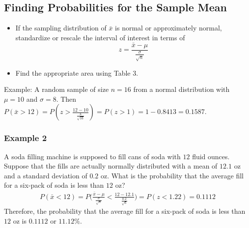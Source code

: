 \documentclass[12pt, letterpaper]{article}
\begin{document}
        \subsection{Finding Probabilities for the Sample Mean}
            \begin{itemize}
                \item If the sampling distribution of $\bar{x}$ is normal or approximately normal, standardize or rescale the interval of interest in terms of $$z = \frac{\bar{x} - \mu}{\frac{\sigma}{\sqrt{n}}}$$
                \item Find the appropriate area using Table 3.
            \end{itemize}
            Example: A random sample of size $n = 16$ from a normal distribution with $\mu = 10$ and $\sigma = 8$. Then $P(\bar{x} > 12) = P(z > \frac{12-10}{\frac{8}{\sqrt{16}}}) = P(z > 1) = 1 - 0.8413 = 0.1587$.
            \newpage\subsubsection{Example 2}
                A soda filling machine is supposed to fill cans of soda with $12$ fluid ounces. Suppose that the fills are actually normally distributed with a mean of $12.1$ oz and a standard deviation of $0.2$ oz. What is the probability that the average fill for a six-pack of soda is less than $12$ oz?
                \begin{align*}
                    P(\bar{x} < 12) = P\bigg(\frac{\bar{x}-\mu}{\frac{\sigma}{\sqrt{n}}} < \frac{12 - 12.1}{\frac{0.2}{\sqrt{6}}}\bigg) = P(z < 1.22) = 0.1112
                \end{align*}
                Therefore, the probability that the average fill for a six-pack of soda is less than $12$ oz is $0.1112$ or $11.12\%$.
\end{document}
